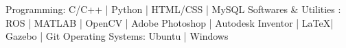 \begin{cvskills}
  \cvskill
  {Programming:}
  {C/C++ | Python | HTML/CSS | MySQL}
  \cvskill
  {Softwares \& Utilities :}
  {ROS | MATLAB | OpenCV | Adobe Photoshop | Autodesk Inventor | \LaTeX | Gazebo | Git}
  \cvskill
  {Operating Systems:}
  {Ubuntu | Windows}
\end{cvskills}
